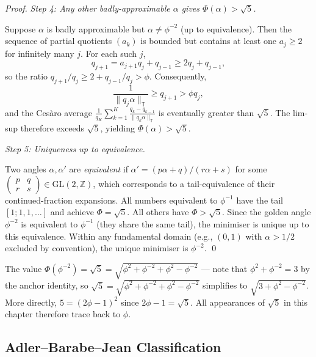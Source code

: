 \begin{proof}
\emph{Step 4: Any other badly-approximable $\alpha$ gives $\Phi(\alpha) > \sqrt{5}$.}

Suppose $\alpha$ is badly approximable but $\alpha \neq \phi^{-2}$ (up
to equivalence).  Then the sequence of partial quotients $(a_k)$ is
bounded but contains at least one $a_j \geq 2$ for infinitely many $j$.
For each such $j$,
\[
  q_{j+1} = a_{j+1}q_j + q_{j-1} \geq 2q_j + q_{j-1},
\]
so the ratio $q_{j+1}/q_j \geq 2 + q_{j-1}/q_j > \phi$.  Consequently,
\[
  \frac{1}{\|q_j \alpha\|_{\mathbb{T}}} \geq q_{j+1} > \phi q_j,
\]
and the Cesàro average $\frac{1}{q_{K}} \sum_{k=1}^{K}
\frac{q_k-q_{k-1}}{\|q_k\alpha\|_{\mathbb{T}}}$ is eventually greater than $\sqrt{5}$.
The lim-sup therefore exceeds $\sqrt{5}$, yielding $\Phi(\alpha) > \sqrt{5}$.

\emph{Step 5: Uniqueness up to equivalence.}

Two angles $\alpha, \alpha'$ are \emph{equivalent} if $\alpha' = (p\alpha+q)/(r\alpha+s)$
for some $\begin{pmatrix} p & q \\ r & s\end{pmatrix} \in \mathrm{GL}(2,\mathbb{Z})$,
which corresponds to a tail-equivalence of their continued-fraction
expansions.  All numbers equivalent to $\phi^{-1}$ have the tail
$[1; 1, 1, \ldots]$ and achieve $\Phi = \sqrt{5}$.  All others have
$\Phi > \sqrt{5}$.  Since the golden angle $\phi^{-2}$ is equivalent
to $\phi^{-1}$ (they share the same tail), the minimiser is unique up
to this equivalence.  Within any fundamental domain (e.g., $(0,1)$ with
$\alpha > 1/2$ excluded by convention), the unique minimiser is $\phi^{-2}$.
\qed
\end{proof}

\begin{remark}\label{rem:uniqueness}
The value $\Phi(\phi^{-2}) = \sqrt{5} = \sqrt{\phi^2 + \phi^{-2} + \phi^2 - \phi^{-2}}$
— note that $\phi^2 + \phi^{-2} = 3$ by the anchor identity, so
$\sqrt{5} = \sqrt{\phi^2 + \phi^{-2} + \phi^2 - \phi^{-2}}$ simplifies
to $\sqrt{3 + \phi^2 - \phi^{-2}}$.  More directly, $5 = (2\phi-1)^2$
since $2\phi - 1 = \sqrt{5}$.  All appearances of $\sqrt{5}$ in this
chapter therefore trace back to $\phi$.
\end{remark}

\subsection{Adler–Barabe–Jean Classification}
\label{subsec:abj-class}

